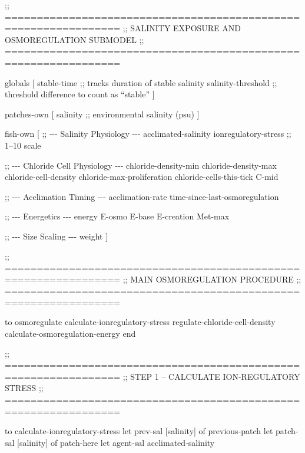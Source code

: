 \documentclass[
]{book}
\newenvironment{Shaded}{\begin{snugshade}}{\end{snugshade}}
\newcommand{\NormalTok}[1]{#1}
\begin{document}
\begin{Shaded}
\begin{Highlighting}[]
\NormalTok{;; ================================================================}
\NormalTok{;; SALINITY EXPOSURE AND OSMOREGULATION SUBMODEL}
\NormalTok{;; ================================================================}

\NormalTok{globals [}
\NormalTok{  stable{-}time                ;; tracks duration of stable salinity}
\NormalTok{  salinity{-}threshold         ;; threshold difference to count as “stable”}
\NormalTok{]}

\NormalTok{patches{-}own [}
\NormalTok{  salinity                   ;; environmental salinity (psu)}
\NormalTok{]}

\NormalTok{fish{-}own [}
\NormalTok{  ;; {-}{-}{-} Salinity Physiology {-}{-}{-}}
\NormalTok{  acclimated{-}salinity}
\NormalTok{  ionregulatory{-}stress       ;; 1–10 scale}

\NormalTok{  ;; {-}{-}{-} Chloride Cell Physiology {-}{-}{-}}
\NormalTok{  chloride{-}density{-}min}
\NormalTok{  chloride{-}density{-}max}
\NormalTok{  chloride{-}cell{-}density}
\NormalTok{  chloride{-}max{-}proliferation}
\NormalTok{  chloride{-}cells{-}this{-}tick}
\NormalTok{  C{-}mid}

\NormalTok{  ;; {-}{-}{-} Acclimation Timing {-}{-}{-}}
\NormalTok{  acclimation{-}rate}
\NormalTok{  time{-}since{-}last{-}osmoregulation}

\NormalTok{  ;; {-}{-}{-} Energetics {-}{-}{-}}
\NormalTok{  energy}
\NormalTok{  E{-}osmo}
\NormalTok{  E{-}base}
\NormalTok{  E{-}creation}
\NormalTok{  Met{-}max}

\NormalTok{  ;; {-}{-}{-} Size Scaling {-}{-}{-}}
\NormalTok{  weight}
\NormalTok{]}


\NormalTok{;; ================================================================}
\NormalTok{;; MAIN OSMOREGULATION PROCEDURE}
\NormalTok{;; ================================================================}

\NormalTok{to osmoregulate}
\NormalTok{  calculate{-}ionregulatory{-}stress}
\NormalTok{  regulate{-}chloride{-}cell{-}density}
\NormalTok{  calculate{-}osmoregulation{-}energy}
\NormalTok{end}


\NormalTok{;; ================================================================}
\NormalTok{;; STEP 1 – CALCULATE ION{-}REGULATORY STRESS}
\NormalTok{;; ================================================================}

\NormalTok{to calculate{-}ionregulatory{-}stress}
\NormalTok{  let prev{-}sal [salinity] of previous{-}patch}
\NormalTok{  let patch{-}sal [salinity] of patch{-}here}
\NormalTok{  let agent{-}sal acclimated{-}salinity}


\end{Highlighting}
\end{Shaded}
\end{document}

